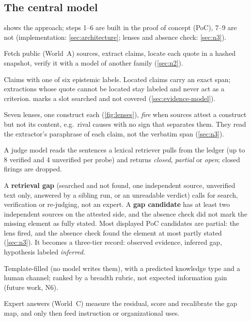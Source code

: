 \subsection{The central model}\label{sec:approach-model}

 shows the approach; steps 1--6 are built in the proof of concept (PoC), 7--9 are
not (implementation: \cref{sec:architecture}; lenses and absence check: \cref{sec:n3}).


\begin{description}[style=nextline, leftmargin=1.5em, itemsep=1pt]
  \item[1 Reconstruct] Fetch public (World~A) sources, extract claims, locate each quote in a hashed
    snapshot, verify it with a model of another family (\cref{sec:n2}).
  \item[2 Evidence ledger] Claims with one of six epistemic labels. Located claims carry an exact
    span; extractions whose quote cannot be located stay labeled  and
    never act as a criterion.  marks a slot searched and not covered
    (\cref{sec:evidence-model}).
  \item[3 Lenses] Seven lenses, one construct each (\cref{fig:lenses}), \emph{fire} when sources
    attest a construct but not its content, e.g.\ rival causes with no sign that separates them.
    They read the extractor's paraphrase of each claim, not the verbatim span (\cref{sec:n3}).
  \item[4 Absence check] A judge model reads the sentences a lexical retriever pulls from the ledger
    (up to 8 verified and 4 unverified per probe) and returns \emph{closed}, \emph{partial} or
    \emph{open}; closed firings are dropped.
  \item[5 Triage] A \textbf{retrieval gap} (searched and not found, one independent source,
    unverified text only, answered by a sibling run, or an unreadable verdict) calls for search,
    verification or re-judging, not an expert. A \textbf{gap candidate} has at least two independent
    sources on the attested side, and the absence check did not mark the missing element as fully
    stated. Most displayed PoC candidates are partial: the lens fired, and the absence check found
    the element at most partly stated (\cref{sec:n3}). It becomes a three-tier
    record: observed evidence, inferred gap, hypothesis labeled \emph{inferred}.
  \item[6 Questions] Template-filled (no model writes them), with a predicted knowledge type and a
    human channel; ranked by a breadth rubric, not expected information gain (future work, N6).
  \item[7--9 Future] Expert answers (World~C) measure the residual, score and recalibrate the gap
    map, and only then feed instruction or organizational uses.
\end{description}

